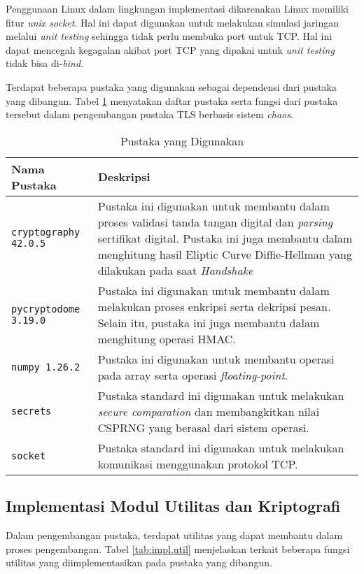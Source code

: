 Penggunaan Linux dalam lingkungan implementasi dikarenakan Linux memiliki fitur \emph{unix socket}. Hal ini dapat digunakan untuk melakukan simulasi jaringan melalui \emph{unit testing} sehingga tidak perlu membuka port untuk TCP. Hal ini dapat mencegah kegagalan akibat port TCP yang dipakai untuk \emph{unit testing} tidak bisa di-\emph{bind}.

Terdapat beberapa pustaka yang digunakan sebagai dependensi dari pustaka yang dibangun. Tabel \ref{tab:impl.lib} menyatakan daftar pustaka serta fungsi dari pustaka tersebut dalam pengembangan pustaka TLS berbasis sistem \emph{chaos}.

\begin{table}[!h]
  \centering
  \caption{Pustaka yang Digunakan} \label{tab:impl.lib}
  \begin{tabular}{|p{4cm}|p{9cm}|}
    \hline
    Nama Pustaka & Deskripsi \\ \hline
    \texttt{cryptography 42.0.5} & Pustaka ini digunakan untuk membantu dalam proses validasi tanda tangan digital dan \emph{parsing} sertifikat digital. Pustaka ini juga membantu dalam menghitung hasil Eliptic Curve Diffie-Hellman yang dilakukan pada saat \emph{Handshake} \\ \hline
    \texttt{pycryptodome 3.19.0} & Pustaka ini digunakan untuk membantu dalam melakukan proses enkripsi serta dekripsi pesan. Selain itu, pustaka ini juga membantu dalam menghitung operasi HMAC. \\ \hline
    \texttt{numpy 1.26.2} & Pustaka ini digunakan untuk membantu operasi pada array serta operasi \emph{floating-point}.\\ \hline
    \texttt{secrets} & Pustaka standard ini digunakan untuk melakukan \emph{secure comparation} dan membangkitkan nilai CSPRNG yang berasal dari sistem operasi. \\ \hline
    \texttt{socket} & Pustaka standard ini digunakan untuk melakukan komunikasi menggunakan protokol TCP.\\ \hline
  \end{tabular}
\end{table}


\subsection{Implementasi Modul Utilitas dan Kriptografi}

Dalam pengembangan pustaka, terdapat utilitas yang dapat membantu dalam proses pengembangan. Tabel \ref{tab:impl.util} menjelaskan terkait beberapa fungsi utilitas yang diimplementasikan pada pustaka yang dibangun.

